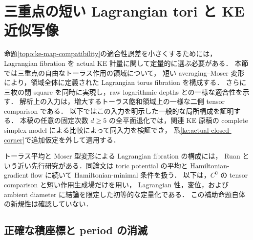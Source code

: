 \section{三重点の短い Lagrangian tori と KE 近似写像}
\label{ke:fiber-compatibility}

命題\ref{topo:ke-map-compatibility}の適合性誤差を小さくするためには，
Lagrangian fibration を actual KE 計量に関して定量的に選ぶ必要がある．
本節では三重点の自由なトーラス作用の領域について，
短い averaging--Moser 変形により，領域全体に定義された Lagrangian torus fibration を構成する．
さらに三枚の閉 square を同時に実現し，raw logarithmic depths との一様な適合性を示す．
解析上の入力は，増大するトーラス飽和領域上の一様な二側 tensor comparison である．
以下ではこの入力を明示した一般的な局所構成を証明する．
本稿の任意の固定次数 $d\ge5$ の全平面退化では，関連 KE 原稿の
complete simplex model による比較によって同入力を検証でき，
系\ref{ke:actual-closed-corner}で追加仮定を外して適用する．

トーラス平均と Moser 型変形による Lagrangian fibration の構成には，
Ruan\cite[\S3, Proposition~3.1, Lemma~3.3, Theorem~3.1]{RuanHMinimal}
という近い先行研究がある．同論文は toric potential の平均と
Hamiltonian-gradient flow に続いて Hamiltonian-minimal 条件を扱う．
以下は，$C^0$ の tensor comparison と短い作用生成場だけを用い，
Lagrangian 性，変位，および ambient diameter に結論を限定した初等的な定量化である．
この補助命題自体の新規性は確認していない．

\subsection{正確な積座標と period の消滅}

